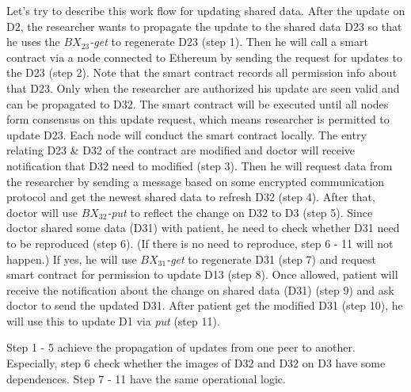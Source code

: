 \documentclass[conference]{IEEEtran}
\begin{document}
Let's try to describe this work flow for updating shared data. After the update on D2, the researcher wants to propagate the update to the shared data D23 so that he uses the \emph{$BX_{23}$-get} to regenerate D23 (step 1). Then he will call a smart contract via a node connected to Ethereum by sending the request for updates to the D23 (step 2). Note that the smart contract records all permission info about that D23. Only when the researcher are authorized his update are seen valid and can be propagated to D32. The smart contract will be executed until all nodes form consensus on this update request, which means researcher is permitted to update D23. Each node will conduct the smart contract locally. The entry relating D23 \& D32 of the contract are modified and doctor will receive notification that D32 need to modified (step 3). Then he will request data from the researcher by sending a message based on some encrypted communication protocol and get the newest shared data to refresh D32 (step 4). After that, doctor will use \emph{$BX_{32}$-put} to reflect the change on D32 to D3 (step 5). Since doctor shared some data (D31) with patient, he need to check whether D31 need to be reproduced (step 6). (If there is no need to reproduce, step 6 - 11 will not happen.) If yes, he will use \emph{$BX_{31}$-get} to regenerate D31 (step 7) and request smart contract for permission to update D13 (step 8). Once allowed, patient will receive the notification about the change on shared data (D31) (step 9) and ask doctor to send the updated D31. After patient get the modified D31 (step 10), he will use this to update D1 via \emph{put} (step 11).  

Step 1 - 5 achieve the propagation of updates from one peer to another. Especially, step 6 check whether the images of D32 and D32 on D3 have some dependences. Step 7 - 11 have the same operational logic.
\end{document}

